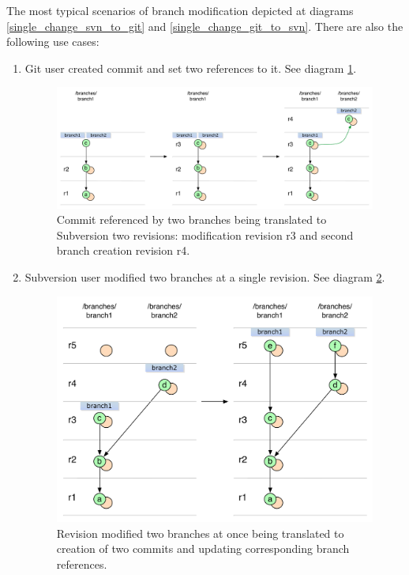 The most typical scenarios of branch modification depicted at diagrams \ref{single_change_svn_to_git} and \ref{single_change_git_to_svn}. There are also the following use cases:

\begin{enumerate}
\compactlist

\item Git user created commit and set two references to it. See diagram \ref{ambiguous_svn_branch_git_to_svn}.
\begin{figure}[!h]
\centering
\renewcommand{\figurename}{Diagram}
\includegraphics[width=\linewidth]{img/diagrams/ambiguous_svn_branch_git_to_svn.pdf}
\caption{Commit referenced by two branches being translated to Subversion two revisions: modification revision r3 and second branch creation revision r4.}
\label{ambiguous_svn_branch_git_to_svn}
\end{figure}

\item Subversion user modified two branches at a single revision. See diagram \ref{double_branch_change_svn_to_git}.
\begin{figure}[!h]
\centering
\renewcommand{\figurename}{Diagram}
\includegraphics[width=\linewidth]{img/diagrams/double_branch_change_svn_to_git.pdf}
\caption{Revision modified two branches at once being translated to creation of two commits and updating corresponding branch references.}
\label{double_branch_change_svn_to_git}
\end{figure}
\end{enumerate}

